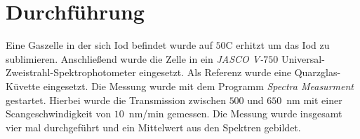 
 
%
\section{Durchführung}

Eine Gaszelle in der sich Iod befindet wurde auf $50$\textdegree C erhitzt um das Iod zu sublimieren. Anschließend wurde die Zelle in ein \textit{JASCO V-$750$} Universal-Zweistrahl-Spektrophotometer eingesetzt. Als Referenz wurde eine Quarzglas-Küvette eingesetzt. Die Messung wurde mit dem Programm \textit{Spectra Measurment} gestartet. Hierbei wurde die Transmission zwischen $500$ und $650$~nm mit einer Scangeschwindigkeit von $10$~nm/min gemessen. Die Messung wurde insgesamt vier mal durchgeführt und ein Mittelwert aus den Spektren gebildet. 











%